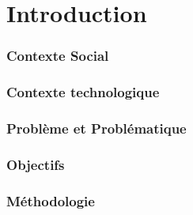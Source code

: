 \chapter*{Introduction}

\subsection*{Contexte Social}


\subsection*{Contexte technologique}




\subsection*{Problème et Problématique}


\subsection*{Objectifs}

\subsection*{Méthodologie}
